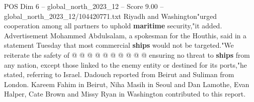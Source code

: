 \begin{textsample}{POS Dim 6 – global\_north\_2023\_12 – Score 9.00 – global\_north\_2023\_12/104420771.txt}
Riyadh and Washington"urged cooperation among all partners to uphold \textbf{maritime} security,"it added.
Advertisement Mohammed Abdulsalam, a spokesman for the Houthis, said in a statement Tuesday that most commercial \textbf{ships} would not be targeted."We reiterate the safety of @ @ @ @ @ @ @ @ @ @ ensuring no threat to \textbf{ships} from any nation, except those linked to the enemy entity or destined for its ports,"he stated, referring to Israel.
Dadouch reported from Beirut and Suliman from London.
Kareem Fahim in Beirut, Niha Masih in Seoul and Dan Lamothe, Evan Halper, Cate Brown and Missy Ryan in Washington contributed to this report.

\end{textsample}

